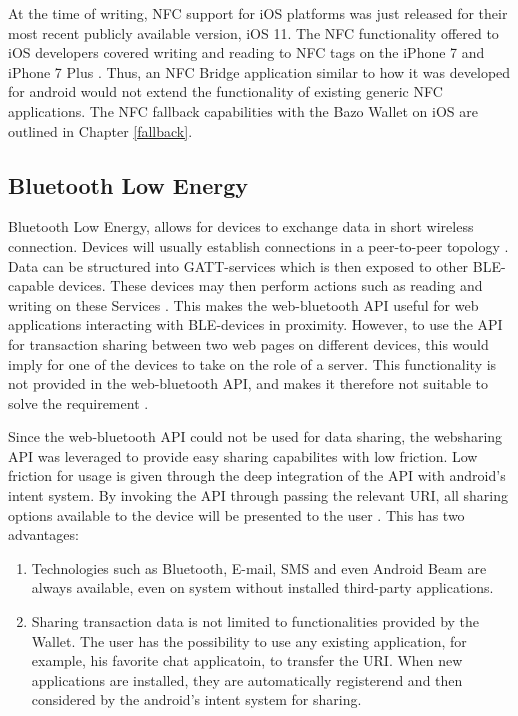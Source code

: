 At the time of writing, NFC support for iOS platforms was just released for their most recent publicly available version, iOS 11. The NFC functionality offered to iOS developers covered writing and reading to NFC tags on the iPhone 7 and iPhone 7 Plus \cite{corenfc}. Thus, an NFC Bridge application similar to how it was developed for android would not extend the functionality of existing generic NFC applications. The NFC fallback capabilities with the Bazo Wallet on iOS are outlined in Chapter \ref{fallback}.
\subsection{Bluetooth Low Energy}\label{ble}
Bluetooth Low Energy, allows for devices to exchange data in short wireless connection. Devices will usually establish connections in a peer-to-peer topology \cite{blep2p}. Data can be structured into GATT-services which is then exposed to other BLE-capable devices. These devices may then perform actions such as reading and writing on these Services \cite{blegatt}. 
This makes the web-bluetooth API useful for web applications interacting with BLE-devices in proximity. However, to use the API for transaction sharing between two web pages on different devices, this would imply for one of the devices to take on the role of a server. This functionality is not provided in the web-bluetooth API, and makes it therefore not suitable to solve the requirement \cite{webble}. 

Since the web-bluetooth API could not be used for data sharing, the websharing API was leveraged to provide easy sharing capabilites with low friction. Low friction for usage is given through the deep integration of the API with android's intent system. By invoking the API through passing the relevant URI, all sharing options available to the device will be presented to the user \cite{webshareapi}. This has two advantages:
\begin{enumerate}
\item Technologies such as Bluetooth, E-mail, SMS and even Android Beam are always available, even on system without installed third-party applications.
\item Sharing transaction data is not limited to functionalities provided by the Wallet. The user has the possibility to use any existing application, for example, his favorite chat applicatoin, to transfer the URI. When new applications are installed, they are automatically registerend and then considered by the android's intent system for sharing.
\end{enumerate}

